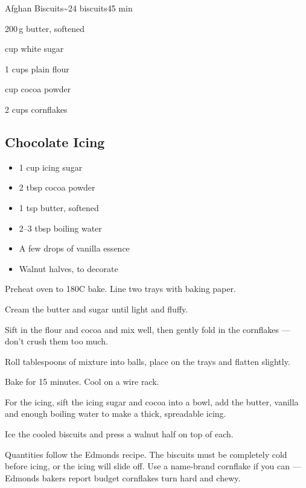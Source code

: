 \begin{recipebox}{Afghan Biscuits}{\textasciitilde24 biscuits}{45 min}
\begin{ingredients}
  \item 200\,g butter, softened
  \item {} cup white sugar
  \item 1 cups plain flour
  \item {} cup cocoa powder
  \item 2 cups cornflakes
\end{ingredients}

\subsection*{Chocolate Icing}
\begin{itemize}[leftmargin=2em]
  \item 1 cup icing sugar
  \item 2 tbsp cocoa powder
  \item 1 tsp butter, softened
  \item 2--3 tbsp boiling water
  \item A few drops of vanilla essence
  \item Walnut halves, to decorate
\end{itemize}

\begin{method}
  \item Preheat oven to 180\degree C bake. Line two trays with baking paper.
  \item Cream the butter and sugar until light and fluffy.
  \item Sift in the flour and cocoa and mix well, then gently fold in the cornflakes --- don't crush them too much.
  \item Roll tablespoons of mixture into balls, place on the trays and flatten slightly.
  \item Bake for 15 minutes. Cool on a wire rack.
  \item For the icing, sift the icing sugar and cocoa into a bowl, add the butter, vanilla and enough boiling water to make a thick, spreadable icing.
  \item Ice the cooled biscuits and press a walnut half on top of each.
\end{method}

\begin{notes}
Quantities follow the Edmonds recipe. The biscuits must be completely cold before icing, or the icing will slide off.
Use a name-brand cornflake if you can --- Edmonds bakers report budget cornflakes turn hard and chewy.
\end{notes}
\end{recipebox}
